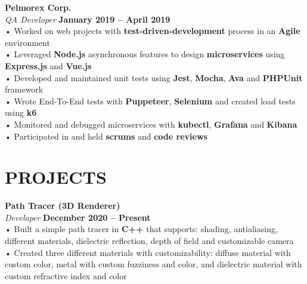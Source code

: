 \documentclass[margin,line]{resume}
\begin{document}
\begin{resume}
    \textbf{\listing Pelmorex Corp.} \vspace{2mm}\\\vspace{1mm}%
    \textsl{QA Developer} \hfill \textbf{January 2019 -- April 2019}\\
    • Worked on web projects with \textbf{test-driven-development} process in an \textbf{Agile} environment\\
    • Leveraged \textbf{Node.js} asynchronous features to design \textbf{microservices} using \textbf{Express.js} and \textbf{Vue.js}\\
    • Developed and maintained unit tests using \textbf{Jest}, \textbf{Mocha}, \textbf{Ava} and \textbf{PHPUnit} framework\\
    • Wrote End-To-End tests with \textbf{Puppeteer}, \textbf{Selenium} and created load tests using \textbf{k6}\\
    • Monitored and debugged microservices with \textbf{kubectl}, \textbf{Grafana} and \textbf{Kibana}\\
    • Participated in and held \textbf{scrums} and \textbf{code reviews}

    \vspace{-1mm}
\sectionline
    \section{\mysidestyle \textbf{\large{P}\small{ROJECTS}}}

    \textbf{\listing Path Tracer (3D Renderer)} \vspace{2mm}\\\vspace{1mm}%
    \textsl{Developer} \hfill \textbf{December 2020 -- Present}\\
    • Built a simple path tracer in \textbf{C++} that supports:
    shading, antialiasing, different materials, dielectric reflection, depth of
    field and customizable camera\\
    • Created three different materials with
    customizability: diffuse material with custom color, metal with custom fuzziness and color, and dielectric material with custom refractive index and color
    \vspace{-1mm}


\end{resume}
\end{document}
